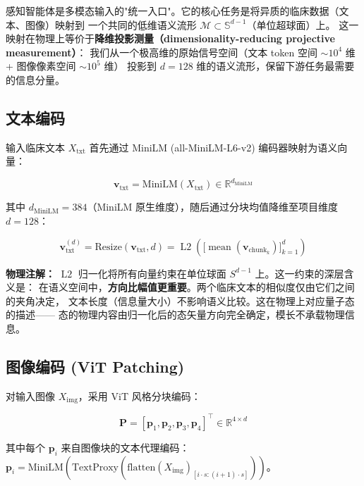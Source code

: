 \documentclass[11pt,a4paper]{ctexart}
\theoremstyle{remark}
\DeclareMathOperator{\Ltwo}{L2}
\begin{document}
感知智能体是多模态输入的"统一入口"。它的核心任务是将异质的临床数据（文本、图像）映射到
一个共同的低维语义流形 $\mathcal{M} \subset \mathbb{S}^{d-1}$（单位超球面）上。
这一映射在物理上等价于\textbf{降维投影测量（dimensionality-reducing projective measurement）}：
我们从一个极高维的原始信号空间（文本 token 空间 $\sim 10^4$ 维 + 图像像素空间 $\sim 10^5$ 维）
投影到 $d=128$ 维的语义流形，保留下游任务最需要的信息分量。

\subsection{文本编码}

输入临床文本 $X_{\text{txt}}$ 首先通过 MiniLM (all-MiniLM-L6-v2) 编码器映射为语义向量：

\begin{equation}
\mathbf{v}_{\text{txt}} = \text{MiniLM}(X_{\text{txt}}) \in \mathbb{R}^{d_{\text{MiniLM}}}
\end{equation}

其中 $d_{\text{MiniLM}} = 384$（MiniLM 原生维度），随后通过分块均值降维至项目维度 $d = 128$：

\begin{equation}
\mathbf{v}_{\text{txt}}^{(d)} = \text{Resize}(\mathbf{v}_{\text{txt}}, d) = \Ltwo\left(\Big[\operatorname{mean}(\mathbf{v}_{\text{chunk}_k})\Big]_{k=1}^{d}\right)
\end{equation}

\textbf{物理注解：} $\Ltwo$ 归一化将所有向量约束在单位球面 $S^{d-1}$ 上。这一约束的深层含义是：
在语义空间中，\textbf{方向比幅值更重要}。两个临床文本的相似度仅由它们之间的夹角决定，
文本长度（信息量大小）不影响语义比较。这在物理上对应量子态的描述——
态的物理内容由归一化后的态矢量方向完全确定，模长不承载物理信息。

\subsection{图像编码 (ViT Patching)}

对输入图像 $X_{\text{img}}$，采用 ViT 风格分块编码：

\begin{equation}
\mathbf{P} = \left[\mathbf{p}_1, \mathbf{p}_2, \mathbf{p}_3, \mathbf{p}_4\right]^{\top} \in \mathbb{R}^{4 \times d}
\end{equation}

其中每个 $\mathbf{p}_i$ 来自图像块的文本代理编码：$\mathbf{p}_i = \text{MiniLM}\left(\text{TextProxy}(\text{flatten}(X_{\text{img}})_{[i\cdot s:(i+1)\cdot s]})\right)$。
\end{document}
